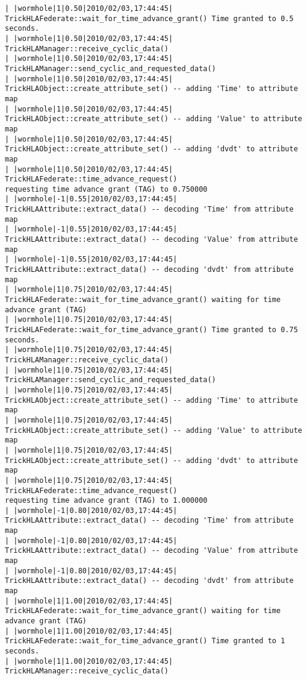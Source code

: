\begin{lstlisting}[numbers=none,caption={output showing conditionally sent cyclic data}]
| |wormhole|1|0.50|2010/02/03,17:44:45| TrickHLAFederate::wait_for_time_advance_grant() Time granted to 0.5 seconds.
| |wormhole|1|0.50|2010/02/03,17:44:45| TrickHLAManager::receive_cyclic_data()
| |wormhole|1|0.50|2010/02/03,17:44:45| TrickHLAManager::send_cyclic_and_requested_data()
| |wormhole|1|0.50|2010/02/03,17:44:45| TrickHLAObject::create_attribute_set() -- adding 'Time' to attribute map
| |wormhole|1|0.50|2010/02/03,17:44:45| TrickHLAObject::create_attribute_set() -- adding 'Value' to attribute map
| |wormhole|1|0.50|2010/02/03,17:44:45| TrickHLAObject::create_attribute_set() -- adding 'dvdt' to attribute map
| |wormhole|1|0.50|2010/02/03,17:44:45| TrickHLAFederate::time_advance_request()   
requesting time advance grant (TAG) to 0.750000
| |wormhole|-1|0.55|2010/02/03,17:44:45| TrickHLAAttribute::extract_data() -- decoding 'Time' from attribute map
| |wormhole|-1|0.55|2010/02/03,17:44:45| TrickHLAAttribute::extract_data() -- decoding 'Value' from attribute map
| |wormhole|-1|0.55|2010/02/03,17:44:45| TrickHLAAttribute::extract_data() -- decoding 'dvdt' from attribute map
| |wormhole|1|0.75|2010/02/03,17:44:45| TrickHLAFederate::wait_for_time_advance_grant() waiting for time advance grant (TAG)
| |wormhole|1|0.75|2010/02/03,17:44:45| TrickHLAFederate::wait_for_time_advance_grant() Time granted to 0.75 seconds.
| |wormhole|1|0.75|2010/02/03,17:44:45| TrickHLAManager::receive_cyclic_data()
| |wormhole|1|0.75|2010/02/03,17:44:45| TrickHLAManager::send_cyclic_and_requested_data()
| |wormhole|1|0.75|2010/02/03,17:44:45| TrickHLAObject::create_attribute_set() -- adding 'Time' to attribute map
| |wormhole|1|0.75|2010/02/03,17:44:45| TrickHLAObject::create_attribute_set() -- adding 'Value' to attribute map
| |wormhole|1|0.75|2010/02/03,17:44:45| TrickHLAObject::create_attribute_set() -- adding 'dvdt' to attribute map
| |wormhole|1|0.75|2010/02/03,17:44:45| TrickHLAFederate::time_advance_request()   
requesting time advance grant (TAG) to 1.000000
| |wormhole|-1|0.80|2010/02/03,17:44:45| TrickHLAAttribute::extract_data() -- decoding 'Time' from attribute map
| |wormhole|-1|0.80|2010/02/03,17:44:45| TrickHLAAttribute::extract_data() -- decoding 'Value' from attribute map
| |wormhole|-1|0.80|2010/02/03,17:44:45| TrickHLAAttribute::extract_data() -- decoding 'dvdt' from attribute map
| |wormhole|1|1.00|2010/02/03,17:44:45| TrickHLAFederate::wait_for_time_advance_grant() waiting for time advance grant (TAG)
| |wormhole|1|1.00|2010/02/03,17:44:45| TrickHLAFederate::wait_for_time_advance_grant() Time granted to 1 seconds.
| |wormhole|1|1.00|2010/02/03,17:44:45| TrickHLAManager::receive_cyclic_data()

\end{lstlisting}
